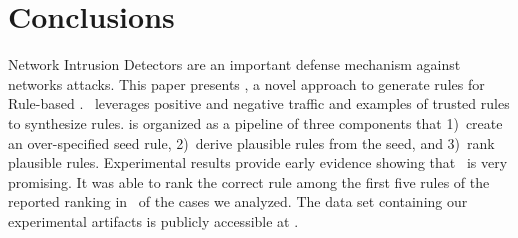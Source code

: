 \documentclass[conference]{IEEEtran}
\begin{document}


\section{Conclusions}

Network Intrusion Detectors are an important defense mechanism against
networks attacks. This paper presents \tname{}, a novel approach to
generate rules for Rule-based \nids. \tname\ leverages positive and
negative traffic and examples of trusted rules to synthesize
rules. \tname{} is organized as a pipeline of three components that
1)~create an over-specified seed rule, 2)~derive plausible rules from
the seed, and 3)~rank plausible rules. Experimental results provide
early evidence showing that \tname\ is very promising. It was able to
rank the correct rule among the first five rules of the reported
ranking in \percTopFiveRanking\ of the cases we analyzed. The data set
containing our experimental artifacts is publicly accessible at
\ourdataset.



\balance
%


\end{document}
